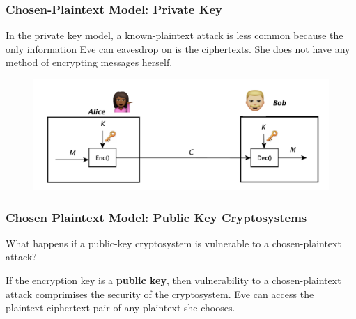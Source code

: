 \documentclass{beamer}
\newcommand{\<}{\langle}
\renewcommand{\>}{\rangle}
\begin{document}
\begin{frame}
\frametitle{Chosen-Plaintext Model: Private Key}

In the private key model, a known-plaintext attack is less common because the only information Eve can eavesdrop on is the ciphertexts. She does not have any method of encrypting messages herself.
\begin{figure}
\includegraphics[scale=.5]{IMG/private_key.pdf}
\end{figure}
\end{frame}


\begin{frame}
\frametitle{Chosen Plaintext Model: Public Key Cryptosystems}

What happens if a public-key cryptosystem is vulnerable to a chosen-plaintext attack? \newline

If the encryption key is a \textbf{public key}, then vulnerability to a chosen-plaintext attack comprimises the security of the cryptosystem. Eve can access the plaintext-ciphertext pair of any plaintext she chooses. 
\end{frame}
\end{document}
